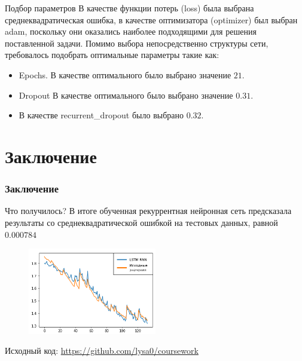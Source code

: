 \documentclass[12pt]{beamer}
\begin{document}
\begin{frame}
\begin{block}{Подбор параметров}
В качестве функции потерь (loss) была выбрана среднеквадратическая ошибка, в качестве оптимизатора (optimizer) был выбран  adam, поскольку они оказались наиболее подходящими для решения поставленной задачи.
  Помимо выбора непосредственно структуры сети, требовалось подобрать оптимальные параметры такие как:
  \begin{itemize} 
    \item Epochs. В качестве оптимального было выбрано значение $21$.
    \item Dropout В качестве оптимального было выбрано значение $0.31$.
    \item В качестве recurrent\_dropout было выбрано $0.32$.
  \end{itemize}
\end{block}
\end{frame}
\section{Заключение}
\begin{frame}
  \frametitle{Заключение}
  \begin{block}{Что получилось?}
  В итоге обученная рекуррентная нейронная сеть предсказала результаты со среднеквадратической ошибкой на тестовых данных, равной $0.000784$
\begin{figure}[h!]
  \center
  \includegraphics[width=0.5\textwidth]{pic/model.png}
  \label{fig:3}
\end{figure}
  \end{block}
\end{frame}
\begin{frame}
  \begin{block}{Исходный код:}
    \href{https://github.com/lysa0/coursework}{https://github.com/lysa0/coursework}
  \end{block}
\end{frame}
\section*{}
\begin{frame}
  \titlepage
\end{frame}
\end{document}
